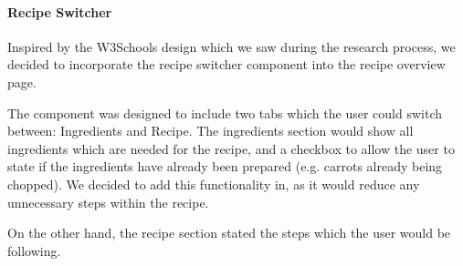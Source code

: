 \documentclass{article}
\begin{document}
\paragraph{Recipe Switcher}
Inspired by the W3Schools design which we saw during the research process, we decided to incorporate the recipe switcher component into the recipe overview page.

The component was designed to include two tabs which the user could switch between: Ingredients and Recipe. The ingredients section would show all ingredients which are needed for the recipe, and a checkbox to allow the user to state if the ingredients have already been prepared (e.g. carrots already being chopped). We decided to add this functionality in, as it would reduce any unnecessary steps within the recipe.

On the other hand, the recipe section stated the steps which the user would be following. 
\end{document}
